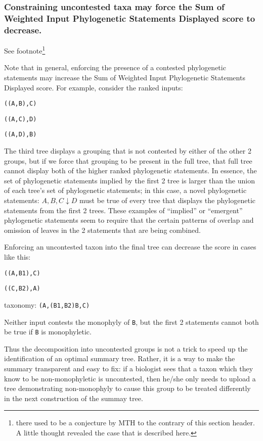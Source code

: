 \documentclass[11pt]{article}
\newcommand{\pss}{phylogenetic statements\xspace}
\newcommand{\PSs}{Phylogenetic Statements\xspace}
\newcommand{\SWIPSD}{Sum of Weighted Input \PSs Displayed\xspace}
\newcommand{\newick}[1]{\texttt{#1}\xspace}
\newcommand{\vvps}[2]{\ensuremath{{#1}\downarrow{#2}}}
\begin{document}
\subsubsection{Constraining uncontested taxa may force the \SWIPSD score to decrease.}
See footnote\footnote{there used to be a conjecture by MTH to the contrary of this section header.
A little thought revealed the case that is described here.}

Note that in general, enforcing the presence of a contested \pss may increase the 
    \SWIPSD score.
For example, consider the ranked inputs:
\begin{compactenum}
\item \newick{((A,B),C)}
\item \newick{((A,C),D)}
\item \newick{((A,D),B)}
\end{compactenum}
The third tree displays a grouping that is not contested by either of the other 2 groups, but
    if we force that grouping to be present in the full tree, that full tree cannot 
    display both of the higher ranked \pss.
In essence, the set of \pss implied by the first 2 tree is larger than the union of each tree's set
    of \pss; in this case, a novel \pss: \vvps{A,B,C}{D} must be true of every 
    tree that displays the \pss from the first 2 trees.
These examples of ``implied'' or ``emergent'' \pss seem to require that the certain
    patterns of overlap and omission of leaves in the 2 statements that are being combined.

Enforcing an uncontested taxon into the final tree can decrease the score in cases like this:
\begin{compactenum}
\item \newick{((A,B1),C)}
\item \newick{((C,B2),A)}
\item taxonomy: \newick{(A,(B1,B2)B,C)}
\end{compactenum}
Neither input contests the monophyly of \texttt{B}, but the first 2 statements cannot 
    both be true if \texttt{B} is monophyletic.

Thus the decomposition into uncontested groups is not a trick to speed up
    the identification of an optimal summary tree.
Rather, it is a way to make the summary transparent and easy to fix:
    if a biologist sees that a taxon which they know to be non-monophyletic
    is uncontested, then he/she only needs to upload a tree demonstrating
    non-monophyly to cause this group to be treated differently in the next 
    construction of the summay tree.
\end{document}
